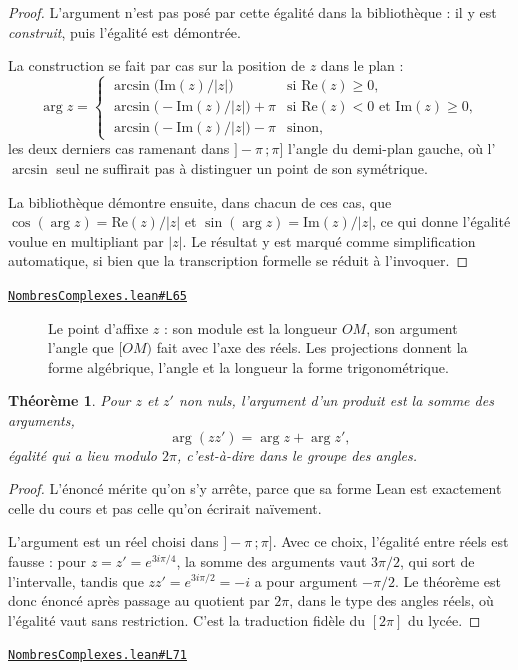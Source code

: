 \documentclass[11pt,a4paper]{article}
\theoremstyle{definition}
\theoremstyle{plain}
\newtheorem{theoreme}{Théorème}
\newcommand{\source}[2]{\par\smallskip\noindent\hfill{\footnotesize\href{#1}{\texttt{#2}}}\par\smallskip}
\begin{document}
\begin{proof}
L'argument n'est pas posé par cette égalité dans la bibliothèque : il y est \emph{construit},
puis l'égalité est démontrée.

La construction se fait par cas sur la position de $z$ dans le plan :
\[ \arg z = \begin{cases}
   \arcsin\bigl(\mathrm{Im}(z)/|z|\bigr) & \text{si } \mathrm{Re}(z) \ge 0 ,\\
   \arcsin\bigl(-\mathrm{Im}(z)/|z|\bigr) + \pi & \text{si } \mathrm{Re}(z) < 0
     \text{ et } \mathrm{Im}(z) \ge 0 ,\\
   \arcsin\bigl(-\mathrm{Im}(z)/|z|\bigr) - \pi & \text{sinon} ,
   \end{cases} \]
les deux derniers cas ramenant dans $]-\pi\,;\pi]$ l'angle du demi-plan gauche, où
l'$\arcsin$ seul ne suffirait pas à distinguer un point de son symétrique.

La bibliothèque démontre ensuite, dans chacun de ces cas, que
$\cos(\arg z) = \mathrm{Re}(z)/|z|$ et $\sin(\arg z) = \mathrm{Im}(z)/|z|$, ce qui donne
l'égalité voulue en multipliant par $|z|$. Le résultat y est marqué comme simplification
automatique, si bien que la transcription formelle se réduit à l'invoquer.
\end{proof}
\source{https://github.com/Commutator-IO/learn-lean/blob/main/courses/02-lycee/07-nombres-complexes/NombresComplexes.lean\#L65}{NombresComplexes.lean\#L65}

\begin{figure}[h]
\centering

\caption{Le point d'affixe $z$ : son module est la longueur $OM$, son argument l'angle que $[OM)$ fait avec l'axe des réels. Les projections donnent la forme algébrique, l'angle et la longueur la forme trigonométrique.}
\end{figure}

\begin{theoreme}
Pour $z$ et $z'$ non nuls, l'argument d'un produit est la somme des arguments,
\[ \arg(zz') = \arg z + \arg z' , \]
égalité qui a lieu \emph{modulo} $2\pi$, c'est-à-dire dans le groupe des angles.
\end{theoreme}

\begin{proof}
L'énoncé mérite qu'on s'y arrête, parce que sa forme Lean est exactement celle du cours et
pas celle qu'on écrirait naïvement.

L'argument est un réel choisi dans $]-\pi\,;\pi]$. Avec ce choix,
l'égalité entre réels est fausse : pour $z = z' = e^{3i\pi/4}$, la somme des arguments vaut
$3\pi/2$, qui sort de l'intervalle, tandis que $zz' = e^{3i\pi/2} = -i$ a pour argument
$-\pi/2$. Le théorème est donc énoncé après passage au quotient par $2\pi$, dans le type
des angles réels, où l'égalité vaut sans restriction. C'est la traduction fidèle du
\og{} $[2\pi]$ \fg{} du lycée.
\end{proof}
\source{https://github.com/Commutator-IO/learn-lean/blob/main/courses/02-lycee/07-nombres-complexes/NombresComplexes.lean\#L71}{NombresComplexes.lean\#L71}
\end{document}

